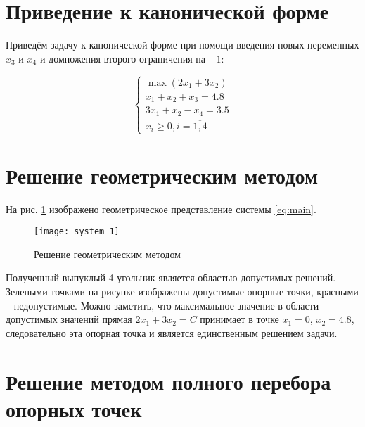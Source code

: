 \section{Приведение к канонической форме}

Приведём задачу к канонической форме при помощи введения новых переменных $x_3$ и $x_4$ и домножения второго ограничения на $-1$:

\begin{equation}
\begin{cases}
	\max \left( 2 x_1 + 3 x_2 \right) \\
	x_1 + x_2 + x_3 = 4.8 \\
	3 x_1 + x_2 - x_4 = 3.5 \\
	x_i \ge 0, i = \overline{1,4}
\end{cases}
\end{equation}

\section{Решение геометрическим методом}

На рис. \ref{pic:geometric_solution} изображено геометрическое представление системы \ref{eq:main}.

\begin{figure}[H]
\begin{center}
	\texttt{[image: system\_1]}
	\caption{Решение геометрическим методом}
	\label{pic:geometric_solution}
\end{center}
\end{figure}

Полученный выпуклый 4-угольник является областью допустимых решений. Зелеными точками на рисунке изображены допустимые опорные точки, красными -- недопустимые. Можно заметить, что максимальное значение в области допустимых значений прямая $2x_1 + 3x_2 = C$ принимает в точке $x_1 = 0$, $x_2 = 4.8$, следовательно эта опорная точка и является единственным решением задачи.

\section{Решение методом полного перебора опорных точек}

